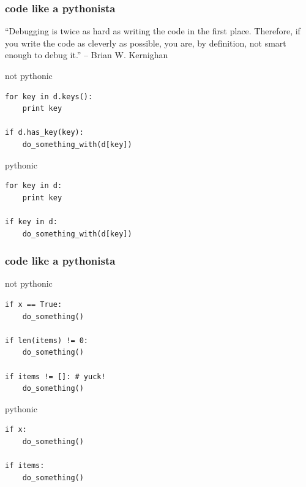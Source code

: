 \documentclass{beamer}
\begin{document}
\begin{frame}[fragile]
	\frametitle{code like a pythonista}
	
	``Debugging is twice as hard as writing the code in the first place. Therefore, if you write the code as cleverly as possible, you are, by definition, not smart enough to debug it.'' -- Brian W. Kernighan
	\pause

	\begin{alertblock}{not pythonic}
	\begin{lstlisting}
for key in d.keys():
    print key

if d.has_key(key):
    do_something_with(d[key])
    \end{lstlisting}
	\end{alertblock}
  	\pause	
	\begin{exampleblock}{pythonic}
	\begin{lstlisting}
for key in d:
    print key

if key in d:
    do_something_with(d[key])
    \end{lstlisting}
	\end{exampleblock}
\end{frame}

\begin{frame}[fragile]
	\frametitle{code like a pythonista}
	
	\begin{alertblock}{not pythonic}
	\begin{lstlisting}
if x == True:
    do_something()

if len(items) != 0:
    do_something()
    
if items != []: # yuck!
    do_something()
    \end{lstlisting}
	\end{alertblock}
 	\pause
	\begin{exampleblock}{pythonic}
	\begin{lstlisting}
if x:
    do_something()
    
if items:
    do_something()    
    \end{lstlisting}
	\end{exampleblock}
\end{frame}
\end{document}

